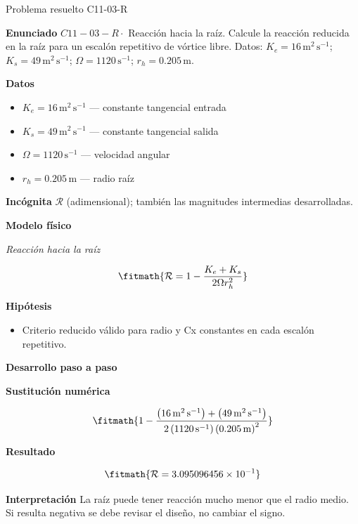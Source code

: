 \documentclass[10pt,openany]{book}
\begin{document}
\begin{studiumworked}{Problema resuelto C11-03-R}


\noindent\textbf{Enunciado}
\(C11-03-R \cdot\) Reacción hacia la raíz. Calcule la reacción reducida en la raíz para un escalón repetitivo de vórtice libre. Datos: \(K_e=16\, \mathrm{m}^{2}\,\mathrm{s}^{-1}\); \(K_s=49\, \mathrm{m}^{2}\,\mathrm{s}^{-1}\); \(\Omega=1120\, \mathrm{s}^{-1}\); \(r_h=0.205\, \mathrm{m}\).

\noindent\textbf{Datos}
\begin{itemize}
\item $K_e = 16\,\mathrm{m}^{2}\,\mathrm{s}^{-1}$ — constante tangencial entrada
\item $K_s = 49\,\mathrm{m}^{2}\,\mathrm{s}^{-1}$ — constante tangencial salida
\item $\Omega = 1120\,\mathrm{s}^{-1}$ — velocidad angular
\item $r_h = 0.205\,\mathrm{m}$ — radio raíz
\end{itemize}

\noindent\textbf{Incógnita}
$\mathcal{R}$ (adimensional); también las magnitudes intermedias desarrolladas.

\noindent\textbf{Modelo físico}

\noindent\textit{Reacción hacia la raíz}

\[
\fitmath{\mathcal R=1 - \frac{K_e + K_s}{2 \Omega r_h^{2}}}
\]

\noindent\textbf{Hipótesis}
\begin{itemize}
\item Criterio reducido válido para radio y Cx constantes en cada escalón repetitivo.
\end{itemize}

\noindent\textbf{Desarrollo paso a paso}



\noindent\textbf{Sustitución numérica}

\[
\fitmath{1 - \frac{\left(16\,\mathrm{m}^{2}\,\mathrm{s}^{-1}\right) + \left(49\,\mathrm{m}^{2}\,\mathrm{s}^{-1}\right)}{2 \left(1120\,\mathrm{s}^{-1}\right) \left(0.205\,\mathrm{m}\right)^{2}}}
\]

\noindent\textbf{Resultado}

\[
\fitmath{\mathcal R=3.095096456\times10^{-1}}
\]

\noindent\textbf{Interpretación}
La raíz puede tener reacción mucho menor que el radio medio. Si resulta negativa se debe revisar el diseño, no cambiar el signo.


\end{studiumworked}
\end{document}
